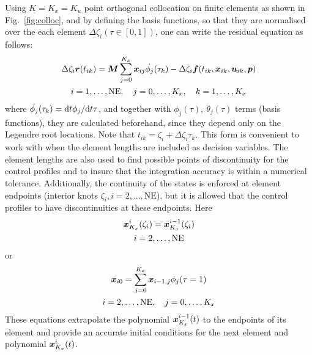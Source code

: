 Using $K = K_{x} = K_{u}$ point orthogonal collocation on finite elements as shown
in Fig.~\ref{fig:colloc}, and by defining the basis functions, so that they
are normalised over the each element $\Delta\zeta_{i}(\tau\in[0,1])$,
one can write the residual equation as follows:
\begin{gather}
\Delta\zeta_{i}\ve{r}(t_{ik}) =
\ve{M}\sum_{j=0}^{K_{x}}\ve{x}_{ij}\dot{\phi_{j}}(\tau_{k}) -
\Delta\zeta_{i}\ve{f}(t_{ik},\ve{x}_{ik},\ve{u}_{ik},\ve{p})\\
i=1,\ldots,\textrm{NE}, \quad j=0,\ldots,K_{x}, \quad k=1,\ldots,K_{x}
\nonumber  
\end{gather}
where $\dot{\phi_{j}}(\tau_{k}) = \textnormal{\text{d}}{}t\phi_{j}/\textnormal{\text{d}}{}t\tau$, and
together with $\phi_{j}(\tau),~\theta_{j}(\tau)$ terms (basis
functions), they are calculated beforehand, since they depend only on
the Legendre root locations. Note that
$t_{ik} = \zeta_{i} + \Delta\zeta_{i}\tau_{k}$. This form is
convenient to work with when the element lengths are included as
decision variables. The element lengths are also used to find possible
points   of discontinuity for the control profiles and to insure that
the integration accuracy is within a numerical tolerance. Additionally,
the continuity of the states is enforced at element endpoints
(interior knots $\zeta_{i},i=2,...,\mathrm{NE}$), but it is allowed that
the control profiles to have discontinuities at these endpoints. Here
\begin{gather}
\ve{x}_{K_{x}}^{i}(\zeta_{i}) = \ve{x}_{K_{x}}^{i-1}(\zeta_{i})\\
i=2,\ldots,\textrm{NE}\nonumber
\end{gather}or
\begin{gather}
\ve{x}_{i0} = \sum_{j=0}^{K_{x}}\ve{x}_{i-1,j}\phi_{j}(\tau=1)\\
i=2,\ldots,\textrm{NE}, \quad j=0,\ldots,K_{x}\nonumber 
\end{gather}
These equations extrapolate the polynomial
$\ve{x}_{K_{x}}^{i-1}(t)$ to the endpoints of its element and provide an
accurate initial conditions for the next element and polynomial
$\ve{x}_{K_{x}}^{i}(t)$. 

